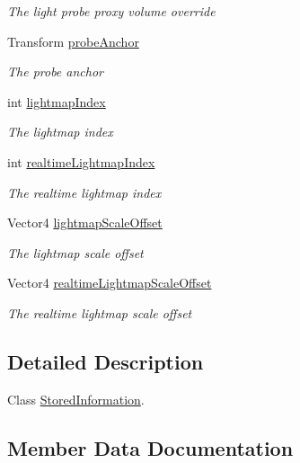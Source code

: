 \begin{DoxyCompactItemize}
\begin{DoxyCompactList}\small\item\em The light probe proxy volume override \end{DoxyCompactList}\item 
Transform \hyperlink{class_serialize_renderer_1_1_stored_information_a09a914e9a616ca0d814245bc2af9c02a}{probe\+Anchor}
\begin{DoxyCompactList}\small\item\em The probe anchor \end{DoxyCompactList}\item 
int \hyperlink{class_serialize_renderer_1_1_stored_information_a7a1e832a0582b3cf779faafbe556cd6b}{lightmap\+Index}
\begin{DoxyCompactList}\small\item\em The lightmap index \end{DoxyCompactList}\item 
int \hyperlink{class_serialize_renderer_1_1_stored_information_ab5b05399f0d593b75d830b5a41a8059c}{realtime\+Lightmap\+Index}
\begin{DoxyCompactList}\small\item\em The realtime lightmap index \end{DoxyCompactList}\item 
Vector4 \hyperlink{class_serialize_renderer_1_1_stored_information_a32b3a6bfb28919610aa4ff164cef6aeb}{lightmap\+Scale\+Offset}
\begin{DoxyCompactList}\small\item\em The lightmap scale offset \end{DoxyCompactList}\item 
Vector4 \hyperlink{class_serialize_renderer_1_1_stored_information_af49a12c36efc4ce35abe00a5f4d9de23}{realtime\+Lightmap\+Scale\+Offset}
\begin{DoxyCompactList}\small\item\em The realtime lightmap scale offset \end{DoxyCompactList}\end{DoxyCompactItemize}


\subsection{Detailed Description}
Class \hyperlink{class_serialize_renderer_1_1_stored_information}{Stored\+Information}. 



\subsection{Member Data Documentation}
\mbox{\label{class_serialize_renderer_1_1_stored_information_a2e6df1181c4de87282435a6aba765661}} 
